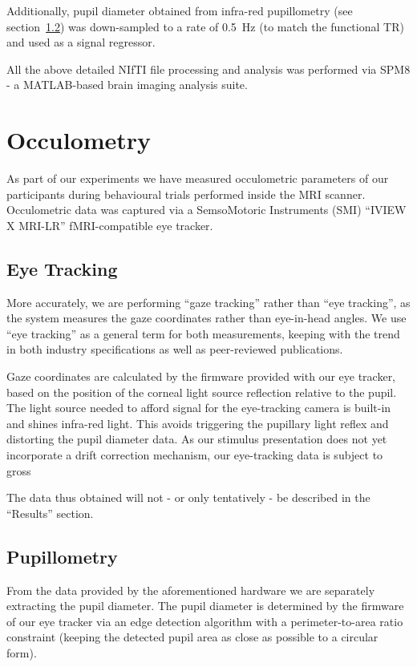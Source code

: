 	    Additionally, pupil diameter obtained from infra-red pupillometry (see section~\ref{sec:m_om_pm}) was down-sampled to a rate of \SI{0.5}{\hertz} (to match the functional TR) and used as a signal regressor.
	    
	    All the above detailed NIfTI file processing and analysis was performed via SPM8 - a MATLAB\textsuperscript{\small\textregistered}-based brain imaging analysis suite.
    \section{Occulometry}\label{sec:m_om}
	As part of our experiments we have measured occulometric parameters of our participants during behavioural trials performed inside the MRI scanner.
	Occulometric data was captured via a SemsoMotoric Instruments (SMI) “IVIEW X\textsuperscript{\small\texttrademark} MRI-LR” fMRI-compatible eye tracker.
	\subsection{Eye Tracking}\label{sec:m_om_et}
	    More accurately, we are performing “gaze tracking” rather than “eye tracking”, as the system measures the gaze coordinates rather than eye-in-head angles.
	    We use “eye tracking” as a general term for both measurements, keeping with the trend in both industry specifications\cite{Bojko2006} as well as peer-reviewed publications\cite{Kirk2013}.
	    
	    Gaze coordinates are calculated by the firmware provided with our eye tracker, based on the position of the corneal light source reflection relative to the pupil.
	    The light source needed to afford signal for the eye-tracking camera is built-in and shines infra-red light.
	    This avoids triggering the pupillary light reflex \cite{Ellis1981} and distorting the pupil diameter data.
	    As our stimulus presentation does not yet incorporate a drift correction mechanism, our eye-tracking data is subject to gross   
	    
	    The data thus obtained will not - or only tentatively - be described in the “Results” section.
	\subsection{Pupillometry}\label{sec:m_om_pm}
	    From the data provided by the aforementioned hardware we are separately extracting the pupil diameter.
	    The pupil diameter is determined by the firmware of our eye tracker via an edge detection algorithm with a perimeter-to-area ratio constraint
	    (keeping the detected pupil area as close as possible to a circular form).
	    
